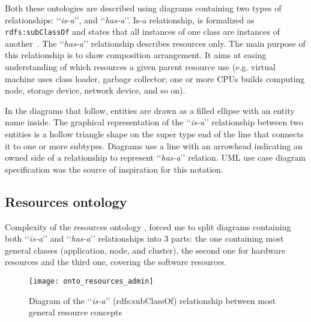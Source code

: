 Both these ontologies are described using diagrams containing two types of relationships: \lq\lq{}\emph{is-a}\rq\rq{}, and \lq\lq{}\emph{has-a}\rq\rq{}. Is-a relationship, is formalized as \texttt{rdfs:subClassOf} and states that all instances of one class are instances of another~\cite{rdfRef:2004}. The \lq\lq{}\emph{has-a}\rq\rq{} relationship describes resources only. The main purpose of this relationship is to show composition arrangement. It aims at easing understanding of which resources a given parent resource use (e.g. virtual machine uses class loader, garbage collector; one or more CPUs builds computing node, storage device, network device, and so on).

In the diagrams that follow, entities are drawn as a filled ellipse with an entity name inside. The graphical representation of the \lq\lq{}\emph{is-a}\rq\rq{} relationship between two entities is a hollow triangle shape on the super type end of the line that connects it to one or more subtypes. Diagrams use a line with an arrowhead indicating an owned side of a relationship to represent \lq\lq{}\emph{has-a}\rq\rq{} relation. UML use case diagram specification was the source of inspiration for this notation.

\subsection{Resources ontology}
\label{subsec:arch_knowledge_resources}

Complexity of the resources ontology , forced me to split diagrams containing both \lq\lq{}\emph{is-a}\rq\rq{} and \lq\lq{}\emph{has-a}\rq\rq{} relationships into 3 parts: the one containing most general classes (application, node, and cluster), the second one for hardware resources and the third one, covering the software resources. 

\begin{figure}[ht]
\centering
\texttt{[image: onto\_resources\_admin]}
\caption{Diagram of the \lq\lq{}\emph{is-a}\rq\rq{} (rdfs:subClassOf) relationship between most general resource concepts}
\label{fig:onto_resources_admin}
\end{figure}

